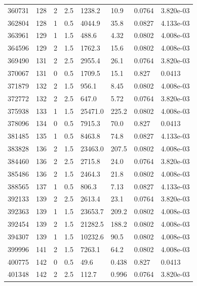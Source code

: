 \documentclass[preview]{standalone}
\begin{document}
{{{{{\begin{tabular}{L{1.2cm}C{1.2cm} C{0.3cm}C{0.5cm} C{1.4cm}C{1.4cm} C{1.4cm}C{1.4cm}}
  360731  &   128  & 2     & 2.5 &  1238.2  & 10.9  & 0.0764 &  3.820e-03   \\ 
  362804  &   128  & 1     & 0.5 &  4044.9  & 35.8  & 0.0827 &  4.133e-03   \\ 
  363961  &   129  & 1     & 1.5 &  488.6  & 4.32  & 0.0802 &  4.008e-03   \\ 
  364596  &   129  & 2     & 1.5 &  1762.3  & 15.6  & 0.0802 &  4.008e-03   \\ 
  369490  &   131  & 2     & 2.5 &  2955.4  & 26.1  & 0.0764 &  3.820e-03   \\ 
  370067  &   131  & 0     & 0.5 &  1709.5  & 15.1  & 0.827 &  0.0413   \\ 
  371879  &   132  & 2     & 1.5 &  956.1  & 8.45  & 0.0802 &  4.008e-03   \\ 
  372772  &   132  & 2     & 2.5 &  647.0  & 5.72  & 0.0764 &  3.820e-03   \\ 
  375938  &   133  & 1     & 1.5 &  25471.0  & 225.2  & 0.0802 &  4.008e-03   \\ 
  378096  &   134  & 0     & 0.5 &  7915.3  & 70.0  & 0.827 &  0.0413   \\ 
  381485  &   135  & 1     & 0.5 &  8463.8  & 74.8  & 0.0827 &  4.133e-03   \\ 
  383828  &   136  & 2     & 1.5 &  23463.0  & 207.5  & 0.0802 &  4.008e-03   \\ 
  384460  &   136  & 2     & 2.5 &  2715.8  & 24.0  & 0.0764 &  3.820e-03   \\ 
  385486  &   136  & 2     & 1.5 &  2464.3  & 21.8  & 0.0802 &  4.008e-03   \\ 
  388565  &   137  & 1     & 0.5 &  806.3  & 7.13  & 0.0827 &  4.133e-03   \\ 
  392133  &   139  & 2     & 2.5 &  2613.4  & 23.1  & 0.0764 &  3.820e-03   \\ 
  392363  &   139  & 1     & 1.5 &  23653.7  & 209.2  & 0.0802 &  4.008e-03   \\ 
  392454  &   139  & 2     & 1.5 &  21282.5  & 188.2  & 0.0802 &  4.008e-03   \\ 
  394307  &   139  & 1     & 1.5 &  10232.6  & 90.5  & 0.0802 &  4.008e-03   \\ 
  399996  &   141  & 2     & 1.5 &  7263.1  & 64.2  & 0.0802 &  4.008e-03   \\ 
  400775  &   142  & 0     & 0.5 &  49.6  & 0.438  & 0.827 &  0.0413   \\ 
  401348  &   142  & 2     & 2.5 &  112.7  & 0.996  & 0.0764 &  3.820e-03   \\ 

\end{tabular}}}}}}
\end{document}
